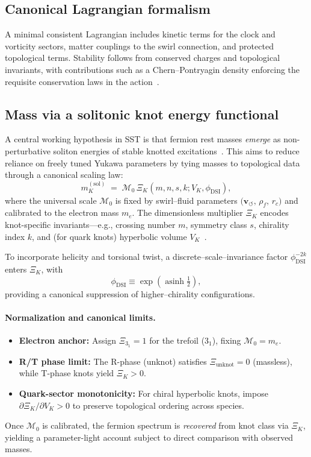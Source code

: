 \documentclass[10pt,reprint,aps,onecolumn,nofootinbib]{revtex4-2}
\begin{document}
    \subsection*{Canonical Lagrangian formalism}
        A minimal consistent Lagrangian includes kinetic terms for the clock and vorticity sectors, matter couplings to the swirl connection, and protected topological terms. Stability follows from conserved charges and topological invariants, with contributions such as a Chern–Pontryagin density enforcing the requisite conservation laws in the action~\cite{4}.

    \subsection*{Mass via a solitonic knot energy functional}
        A central working hypothesis in SST is that fermion rest masses \emph{emerge} as non-perturbative soliton energies of stable knotted excitations~\cite{4}. This aims to reduce reliance on freely tuned Yukawa parameters by tying masses to topological data through a canonical scaling law:
        \begin{equation}
        m_K^{(\mathrm{sol})} \;=\; \mathcal{M}_0 \,\Xi_K(m,n,s,k;V_K,\phi_{\mathrm{DSI}}),
        \label{eq:masslaw}
        \end{equation}
        where the universal scale $\mathcal{M}_0$ is fixed by swirl–fluid parameters $\big(\mathbf{v}_{\!\boldsymbol{\circlearrowleft}},\,\rho_{\!f},\,r_c\big)$ and calibrated to the electron mass $m_e$. The dimensionless multiplier $\Xi_K$ encodes knot-specific invariants—e.g., crossing number $m$, symmetry class $s$, chirality index $k$, and (for quark knots) hyperbolic volume $V_K$~\cite{4}.

        To incorporate helicity and torsional twist, a discrete–scale–invariance factor $\phi_{\mathrm{DSI}}^{-2k}$ enters $\Xi_K$, with
        \[
            \phi_{\mathrm{DSI}} \equiv \exp\!\left(\operatorname{asinh}\tfrac12\right),
        \]
        providing a canonical suppression of higher–chirality configurations.

        \paragraph{Normalization and canonical limits.}
            \begin{itemize}
            \item \textbf{Electron anchor:} Assign $\Xi_{3_1}=1$ for the trefoil ($3_1$), fixing $\mathcal{M}_0=m_e$.
            \item \textbf{R/T phase limit:} The R-phase (unknot) satisfies $\Xi_{\mathrm{unknot}}=0$ (massless), while T-phase knots yield $\Xi_K>0$.
            \item \textbf{Quark-sector monotonicity:} For chiral hyperbolic knots, impose $\partial \Xi_K/\partial V_K>0$ to preserve topological ordering across species.
            \end{itemize}
            Once $\mathcal{M}_0$ is calibrated, the fermion spectrum is \emph{recovered} from knot class via $\Xi_K$, yielding a parameter-light account subject to direct comparison with observed masses.
\end{document}
